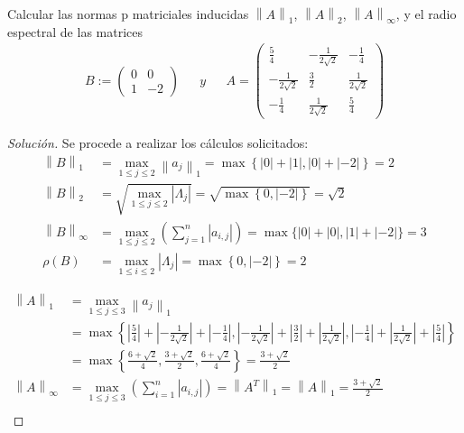 \documentclass[12pt]{book}
\newcommand\norm[1]{\left\lVert#1\right\rVert}
\newcommand\abs[1]{\left\lvert#1\right\rvert}
\newenvironment{solucion}
  {\renewcommand\qedsymbol{$\square$}\begin{proof}[Solución]}
  {\end{proof}}
\begin{document}
\eje Calcular las normas p matriciales inducidas $\norm{A}_1$, $\norm{A}_2$, $\norm{A}_\infty$, y el radio espectral de las matrices
\begin{align*}
    B:=\begin{pmatrix}
    0 & 0\\
    1 & -2
    \end{pmatrix} && y && A=\begin{pmatrix}
    \frac{5}{4} & -\frac{1}{2\sqrt{2}} & -\frac{1}{4}\\[8pt]
    -\frac{1}{2\sqrt{2}} & \frac{3}{2} & \frac{1}{2\sqrt{2}}\\[8pt]
    -\frac{1}{4} & \frac{1}{2\sqrt{2}} & \frac{5}{4}
    \end{pmatrix}
\end{align*}
\begin{solucion}
Se procede a realizar los cálculos solicitados:
\begin{align*}
    \norm{B}_1&=\max_{1\leq j\leq 2}\norm{a_j}_1=\max\left\{\abs{0}+\abs{1}, \abs{0}+\abs{-2}\right\}=2\\
    \norm{B}_2&=\sqrt{\max_{1\leq j\leq2}\abs{\Lambda_j}}=\sqrt{\max\left\{0,\abs{-2}\right\}}=\sqrt{2}\\
    \norm{B}_\infty&=\max_{1\leq j\leq 2}\left(\sum_{j=1}^n\abs{a_{i,j}}\right)=\max\{\abs{0}+\abs{0}, \abs{1}+\abs{-2}\}=3\\
    \rho(B)&=\max_{1\leq i\leq2}\abs{\Lambda_j}=\max\left\{0,\abs{-2}\right\}=2
\end{align*}

\begin{align*}
    \norm{A}_1&=\max_{1\leq j\leq 3}\norm{a_j}_1\\
    &=\max\left\{\abs{\frac{5}{4}}+\abs{-\frac{1}{2\sqrt{2}}}+\abs{-\frac{1}{4}}, \abs{-\frac{1}{2\sqrt{2}}}+\abs{\frac{3}{2}}+\abs{\frac{1}{2\sqrt{2}}}, \abs{-\frac{1}{4}}+\abs{\frac{1}{2\sqrt{2}}}+\abs{\frac{5}{4}}\right\}\\
    &=\max\left\{\frac{6+\sqrt{2}}{4},\frac{3+\sqrt{2}}{2},\frac{6+\sqrt{2}}{4}\right\}=\frac{3+\sqrt{2}}{2}\\
    \norm{A}_\infty&=\max_{1\leq j\leq 3}\left(\sum_{i=1}^n\abs{a_{i,j}}\right)=\norm{A^T}_1=\norm{A}_1=\frac{3+\sqrt{2}}{2}\\
\end{align*}


\end{solucion}
\end{document}
